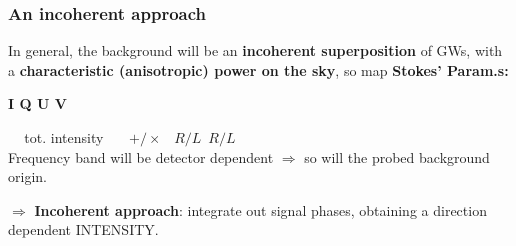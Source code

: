 \begin{frame}
	\frametitle{An incoherent approach}
    	In general, the background will be an \textbf{incoherent superposition} of GWs, with a 								\textbf{characteristic (anisotropic) power on the sky}, so map \textbf{Stokes' Param.s:} \\
        \begin{center}
        \textcolor{blue!70!black}{\textbf{ \quad\quad I \qquad\qquad Q \qquad\qquad U \qquad\qquad V\quad\quad} }\\
        \end{center}
        \textcolor{blue!70!black}{\qquad\,\,\,\,\, tot. intensity \,\,\,\,\,\,\, $+/\times$ \qquad\quad\, $R/L$ 				\quad\qquad\,$R/L$}\\
        \bigskip
        Frequency band will be detector dependent $\Rightarrow$ so will the probed background origin.\\
        \medskip
          \begin{block}{}
              $\Rightarrow$ \textbf{Incoherent approach}: integrate out signal phases, obtaining a direction dependent INTENSITY.\\
          \end{block}
\end{frame}



